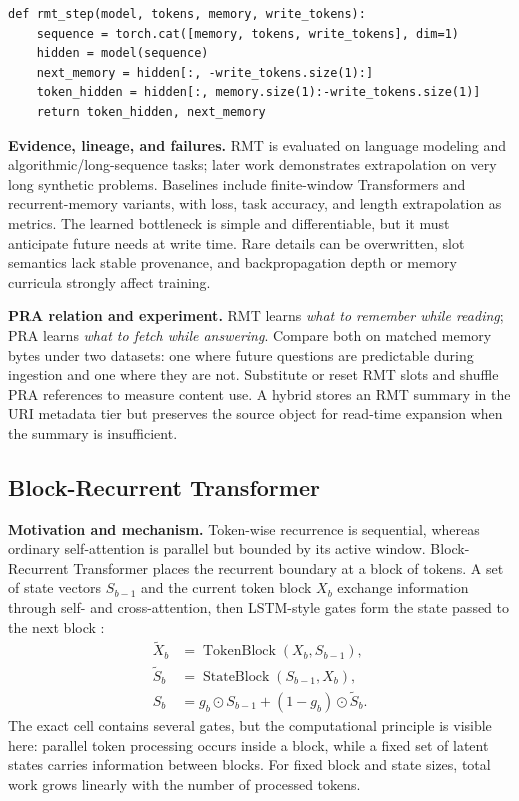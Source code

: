 \begin{lstlisting}[caption={RMT segment interface}]
def rmt_step(model, tokens, memory, write_tokens):
    sequence = torch.cat([memory, tokens, write_tokens], dim=1)
    hidden = model(sequence)
    next_memory = hidden[:, -write_tokens.size(1):]
    token_hidden = hidden[:, memory.size(1):-write_tokens.size(1)]
    return token_hidden, next_memory
\end{lstlisting}

\textbf{Evidence, lineage, and failures.} RMT is evaluated on language modeling and
algorithmic/long-sequence tasks; later work demonstrates extrapolation on very long synthetic
problems.  Baselines include finite-window Transformers and recurrent-memory variants, with
loss, task accuracy, and length extrapolation as metrics.  The learned bottleneck is simple
and differentiable, but it must anticipate future needs at write time.  Rare details can be
overwritten, slot semantics lack stable provenance, and backpropagation depth or memory
curricula strongly affect training.

\textbf{PRA relation and experiment.} RMT learns \emph{what to remember while reading};
PRA learns \emph{what to fetch while answering}.  Compare both on matched memory bytes under
two datasets: one where future questions are predictable during ingestion and one where they
are not.  Substitute or reset RMT slots and shuffle PRA references to measure content use.
A hybrid stores an RMT summary in the URI metadata tier but preserves the source object for
read-time expansion when the summary is insufficient.

\subsection{Block-Recurrent Transformer}

\textbf{Motivation and mechanism.} Token-wise recurrence is sequential, whereas ordinary
self-attention is parallel but bounded by its active window. Block-Recurrent Transformer
places the recurrent boundary at a block of tokens. A set of state vectors $S_{b-1}$ and
the current token block $X_b$ exchange information through self- and cross-attention, then
LSTM-style gates form the state passed to the next block \citep{hutchins2022blockrecurrent}:
\begin{align}
\widetilde X_b&=\operatorname{TokenBlock}(X_b,S_{b-1}),\\
\widetilde S_b&=\operatorname{StateBlock}(S_{b-1},X_b),\\
S_b&=g_b\odot S_{b-1}+(1-g_b)\odot\widetilde S_b.
\end{align}
The exact cell contains several gates, but the computational principle is visible here:
parallel token processing occurs inside a block, while a fixed set of latent states carries
information between blocks. For fixed block and state sizes, total work grows linearly with
the number of processed tokens.

